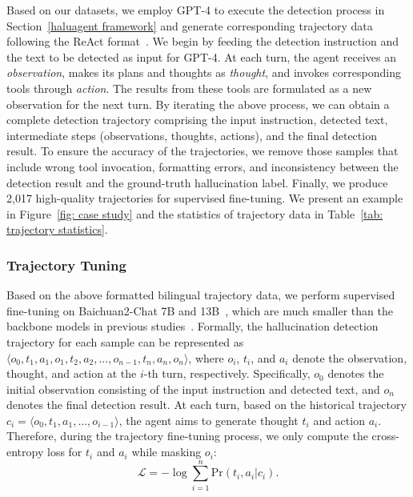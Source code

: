 Based on our datasets, we employ GPT-4 to execute the detection process in Section~\ref{haluagent framework} and generate corresponding trajectory data following the ReAct format~\cite{yao2023react}. We begin by feeding the detection instruction and the text to be detected as input for GPT-4. At each turn, the agent receives an \emph{observation}, makes its plans and thoughts as \textit{thought}, and invokes corresponding tools through \textit{action}. The results from these tools are formulated as a new observation for the next turn. By iterating the above process, we can obtain a complete detection trajectory comprising the input instruction, detected text, intermediate steps (\ie observations, thoughts, actions), and the final detection result. To ensure the accuracy of the trajectories, we remove those samples that include wrong tool invocation, formatting errors, and inconsistency between the detection result and the ground-truth hallucination label. Finally, we produce 2,017 high-quality trajectories for supervised fine-tuning. We present an example in Figure~\ref{fig: case study} and the statistics of trajectory data in Table~\ref{tab: trajectory statistics}.


\subsubsection{Trajectory Tuning}
Based on the above formatted bilingual trajectory data, we perform supervised fine-tuning on Baichuan2-Chat 7B and 13B~\cite{yang2023baichuan}, which are much smaller than the backbone models in previous studies~\cite{chern2023factool,wei2024long}. 
Formally, the hallucination detection trajectory for each sample can be represented as $\langle o_0, t_1, a_1, o_1, t_2, a_2, \ldots, o_{n-1}, t_n, a_n, o_n \rangle$, where $o_i$, $t_i$, and $a_i$ denote the observation, {thought}, and {action} at the $i$-th turn, respectively. Specifically, $o_0$ denotes the initial observation consisting of the input instruction and detected text, and $o_n$ denotes the final detection result. At each turn, based on the historical trajectory $c_i = \langle o_0, t_1, a_1, \ldots, o_{i-1} \rangle$, the agent aims to generate thought $t_i$ and action $a_i$.
Therefore, during the trajectory fine-tuning process, we only compute the cross-entropy loss for $t_i$ and $a_i$ while masking $o_i$:
\begin{equation}
    \mathcal{L} = -\log \sum_{i=1}^{n} \text{Pr}(t_i,a_i|c_i).
\end{equation}



